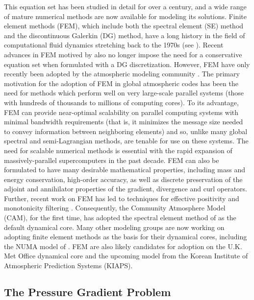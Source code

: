 \documentclass[11pt]{article}
\begin{document}
This equation set has been studied in detail for over a century, and a wide range of mature numerical methods are now available for modeling its solutions.  Finite element methods (FEM), which include both the spectral element (SE) method and the discontinuous Galerkin (DG) method, have a long history in the field of computational fluid dynamics stretching back to the 1970s (see \cite{patera:84,maday:89,FBSR1997JCP,BCCWS1998JCP}).  Recent advances in FEM motived by \cite{HTH2007AIAA} also no longer impose the need for a conservative equation set when formulated with a DG discretization.  However, FEM have only recently been adopted by the atmospheric modeling community \citep{taylor:97,FXGJSHTW2002JCP,FXGTER2004MWR,AFMTJT2004MWR,NTL2005MWR,FXGMR2008JCP,JFKFXG2012JCP}.  The primary motivation for the adoption of FEM in global atmospheric codes has been the need for methods which perform well on very large-scale parallel systems (those with hundreds of thousands to millions of computing cores).  To its advantage, FEM can provide near-optimal scalability on parallel computing systems with minimal bandwidth requirements (that is, it minimizes the message size needed to convey information between neighboring elements) and so, unlike many global spectral and semi-Lagrangian methods, are tenable for use on these systems.  The need for scalable numerical methods is essential with the rapid expansion of massively-parallel supercomputers in the past decade.  FEM can also be formulated to have many desirable mathematical properties, including mass and energy conservation, high-order accuracy, as well as discrete preservation of the adjoint and annihilator properties of the gradient, divergence and curl operators.  Further, recent work on FEM has led to techniques for effective positivity and monotonicity filtering \citep{OGMATASC2013}.  Consequently, the Community Atmosphere Model (CAM), for the first time, has adopted the spectral element method of \cite{MTAF2010JCP} as the default dynamical core.  Many other modeling groups are now working on adopting finite element methods as the basis for their dynamical cores, including the NUMA model of \cite{JFKFXG2012JCP}.  FEM are also likely candidates for adoption on the U.K. Met Office dynamical core and the upcoming model from the Korean Institute of Atmospheric Prediction Systems (KIAPS).

\subsection{The Pressure Gradient Problem} \label{sec:PressureGradientProblem}
\end{document}

